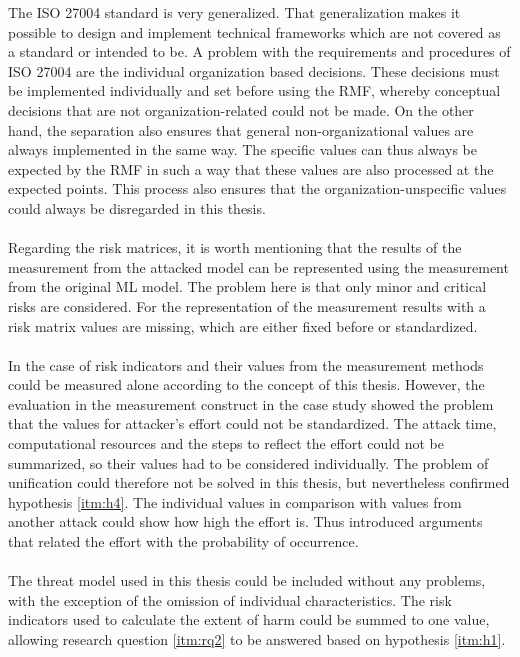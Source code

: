 The ISO 27004 \cite{ISO_27004_2009} standard is very generalized. That generalization makes it possible to design and implement technical frameworks which are not covered as a standard or intended to be. A problem with the requirements and procedures of ISO 27004 are the individual organization based decisions. These decisions must be implemented individually and set before using the RMF, whereby conceptual decisions that are not organization-related could not be made. On the other hand, the separation also ensures that general non-organizational values are always implemented in the same way. The specific values can thus always be expected by the RMF in such a way that these values are also processed at the expected points. This process also ensures that the organization-unspecific values could always be disregarded in this thesis. \\ \\
Regarding the risk matrices, it is worth mentioning that the results of the measurement from the attacked model can be represented using the measurement from the original ML model. The problem here is that only minor and critical risks are considered. For the representation of the measurement results with a risk matrix values are missing, which are either fixed before or standardized. \\ \\
In the case of risk indicators and their values from the measurement methods could be measured alone according to the concept of this thesis. However, the evaluation in the measurement construct in the case study showed the problem that the values for attacker's effort could not be standardized. The attack time, computational resources and the steps to reflect the effort could not be summarized, so their values had to be considered individually. The problem of unification could therefore not be solved in this thesis, but nevertheless confirmed hypothesis \ref{itm:h4}. The individual values in comparison with values from another attack could show how high the effort is. Thus introduced arguments that related the effort with the probability of occurrence. \\ \\
The threat model used in this thesis could be included without any problems, with the exception of the omission of individual characteristics. The risk indicators used to calculate the extent of harm could be summed to one value, allowing research question \ref{itm:rq2} to be answered based on hypothesis \ref{itm:h1}.

